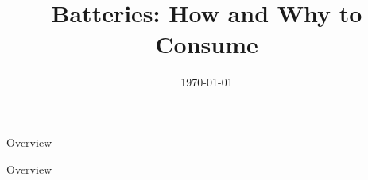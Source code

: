 \documentclass{beamerPresentation}
\title[Batteries]{Batteries: How and Why to Consume} %
\author{\name} %
\institute[\companyAbbrev] %
{
\company\\ %
\medskip
\textit{\email} %
}
\date{\today} %
\begin{document}
\begin{frame}
	\maketitle
\end{frame}

\begin{frame}{Overview}
	\tableofcontents
\end{frame}


\begin{frame}
	\maketitle
\end{frame}

\begin{frame}{Overview}
	\tableofcontents
\end{frame}
\end{document}
